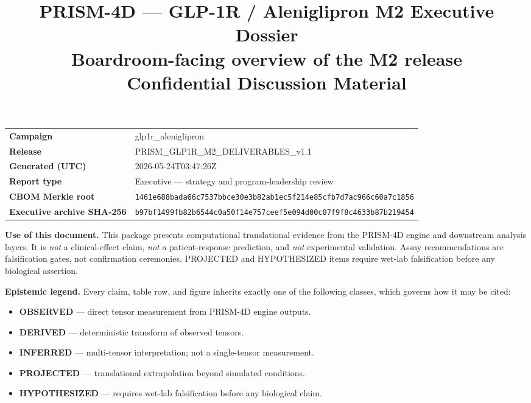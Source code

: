 \documentclass[11pt,a4paper]{article}
\title{
  \vspace{-12mm}
  {\color{DelfBlue}\textbf{\Large PRISM-4D — GLP-1R / Aleniglipron M2 Executive Dossier}}\\[2pt]
  {\color{DelfGrey}\normalsize Boardroom-facing overview of the M2 release}\\[6pt]
  {\color{DelfGrey}\small Confidential Discussion Material}
}
\author{}
\date{}
\newcommand{\epOBS}{\textcolor{EpObserved}{\textbf{OBSERVED}}}
\newcommand{\epDER}{\textcolor{EpDerived}{\textbf{DERIVED}}}
\newcommand{\epINF}{\textcolor{EpInferred}{\textbf{INFERRED}}}
\newcommand{\epPRJ}{\textcolor{EpProjected}{\textbf{PROJECTED}}}
\newcommand{\epHYP}{\textcolor{EpHypothesized}{\textbf{HYPOTHESIZED}}}
\begin{document}
\maketitle
\vspace{-14mm}

\begin{flushleft}
\small
\begin{tabular}{@{}p{}p{}@{}}
\textbf{Campaign}             & glp1r\_aleniglipron \\
\textbf{Release}              & PRISM\_GLP1R\_M2\_DELIVERABLES\_v1.1 \\
\textbf{Generated (UTC)}      & 2026-05-24T03:47:26Z \\
\textbf{Report type}          & Executive — strategy and program-leadership review \\
\textbf{CBOM Merkle root}     & \texttt{\small 1461e688bada66c7537bbce30e3b82ab1ec5f214e85cfb7d7ac966c60a7c1856} \\
\textbf{Executive archive SHA-256} & \texttt{\small b97bf1499fb82b6544c0a50f14e757ceef5e094d00c07f9f8c4633b87b219454} \\
\end{tabular}
\end{flushleft}

\vspace{4mm}

\begin{disclaimerbox}
\textbf{Use of this document.} This package presents computational
translational evidence from the PRISM-4D engine and downstream analysis
layers. It is \emph{not} a clinical-effect claim, \emph{not} a
patient-response prediction, and \emph{not} experimental validation.
Assay recommendations are falsification gates, not confirmation
ceremonies. PROJECTED and HYPOTHESIZED items require wet-lab
falsification before any biological assertion.
\end{disclaimerbox}

\begin{legendbox}
\textbf{Epistemic legend.} Every claim, table row, and figure inherits
exactly one of the following classes, which governs how it may be cited:
\begin{itemize}[leftmargin=18pt,topsep=2pt,itemsep=1pt]
  \item \epOBS{} — direct tensor measurement from PRISM-4D engine outputs.
  \item \epDER{} — deterministic transform of observed tensors.
  \item \epINF{} — multi-tensor interpretation; not a single-tensor measurement.
  \item \epPRJ{} — translational extrapolation beyond simulated conditions.
  \item \epHYP{} — requires wet-lab falsification before any biological claim.
\end{itemize}
\end{legendbox}
\end{document}
